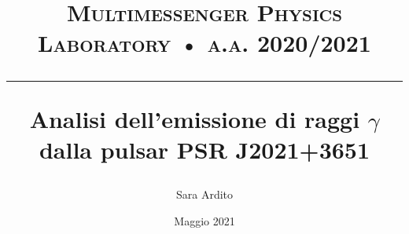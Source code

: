 \documentclass[a4paper,twocolumn]{article}
\begin{document}
	\title{	
	\normalfont \normalsize 
	\textsc{Multimessenger Physics Laboratory  •  a.a. 2020/2021} \\ 
	  [10pt]
	\hrule height 0.4pt
	\bigskip
    	\Huge \textbf{Analisi dell'emissione di raggi $\gamma$ dalla pulsar PSR J2021+3651} \\ %
         [9pt]
}
\date{\large{Maggio 2021}}
\author{Sara Ardito}


\maketitle
\end{document}
